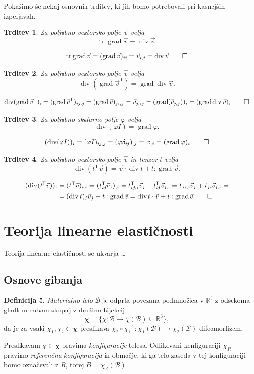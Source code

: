 \documentclass[12pt,a4paper]{article}
\theoremstyle{definition} %
\newtheorem{definicija}{Definicija}[section]
\theoremstyle{plain} %
\newtheorem{trditev}[definicija]{Trditev}
\numberwithin{equation}{section}
\newcommand{\R}{\mathbb R}
\newcommand{\B}{\mathcal{B}}
\newcommand{\T}{\mathsf{T}}
\renewcommand{\div}{\operatorname{div}}
\newcommand{\grad}{\operatorname{grad}}
\renewcommand{\b}{\boldsymbol}
\renewcommand{\phi}{\varphi}
\newcommand{\vv}{\vec{v}}
\DeclareMathOperator{\tr}{tr}
\begin{document}
Pokažimo še nekaj osnovnih trditev, ki jih bomo potrebovali pri kasnejših
izpeljavah.
\begin{trditev}
  Za poljubno vektorsko polje $\vv$ velja
  \[ \tr\grad \vv = \div \vv. \]
\end{trditev}
\proof
\[
  \tr\grad\vv = (\grad\vv)_{ii} = \vv_{i,i} = \div \vv \qedhere
\]
\endproof
\begin{trditev}
  Za poljubno vektorsko polje $\vv$ velja
  \[ \div(\grad\vv^\T) = \grad\div \vv.  \]
\end{trditev}
\proof
\[
  \div(\grad \vv^\T)_i = (\grad\vv^\T)_{ij,j} = (\grad \vv)_{ji,j} = \vv_{j,ij}
  = (\grad(\vv_{j,j}))_i = (\grad\div \vv)_i \qedhere
\]
\endproof
\begin{trditev}
  Za poljubno skalarno polje $\phi$ velja
  \[ \div(\phi I) = \grad \phi.  \]
\end{trditev}
\proof
\[
  (\div(\phi I))_i = (\phi I)_{ij,j} = (\phi \delta_{ij})_{,j} = \phi_{,i} =
  (\grad \phi)_i \qedhere
\]
\endproof
\begin{trditev}
  Za poljubno vektorsko polje $\vv$ in tenzor $t$ velja
  \label{trd:div-tv}
  \[
    \div(t^\T \vv) = \vv \cdot \div t + t : \grad\vv.
    \]
\end{trditev}
\proof
\begin{align*}
  (\div(t^\T \vv))_i &= (t^\T\vv)_{i,i} = (t^\T_{ij} \vv_j)_{,i} =
    t^\T_{ij,i} \vv_j + t^\T_{ij} \vv_{j,i} =
    t_{ji,i} \vv_j + t_{ji} \vv_{j,i} = \\
    &=  (\div t)_j \vv_j + t:\grad \vv = \div t \cdot \vv + t:\grad \vv\qedhere
\end{align*}
\endproof

\newpage

\section{Teorija linearne elastičnosti}
Teorija linearne elastičnosti se ukvarja  \dots

\subsection{Osnove gibanja}

\begin{definicija}
  \emph{Materialno telo} $\B$ je odprta povezana podmnožica v $\R^3$ z odsekoma gladkim
  robom skupaj z družino bijekcij
  \[
    \b\chi = \{\chi \colon\B\to\chi(\B) \subseteq \R^3\},
  \]
  da je za vsaki $\chi_1, \chi_2 \in \b\chi$ preslikava
  $\chi_2\circ\chi_1^{-1}\colon \chi_1(\B) \to \chi_2(\B)$
  difeomorfizem.

  Preslikavam $\chi \in \b\chi$ pravimo \emph{konfiguracije} telesa. Odlikovani
  konfiguraciji $\chi_R$ pravimo \emph{referenčna konfiguracija} in območje, ki
  ga telo zaseda v tej konfiguraciji bomo označevali z $B$, torej $B =
  \chi_R(\B)$.
\end{definicija}
\end{document}
